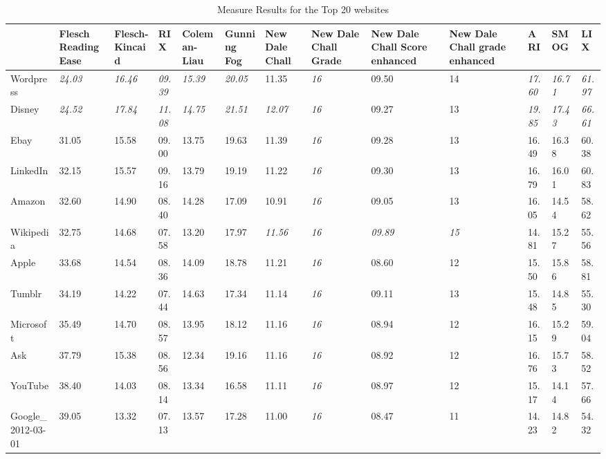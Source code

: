 \documentclass[runningheads,a4paper]{llncs}
\begin{document}
\begin{table}
  \centering
    \caption{Measure Results for the Top 20 websites}
    \begin{tabular}{p{3.3cm}p{1.5cm}p{1.5cm}p{1.5cm}p{1.5cm}p{1.5cm}p{1.5cm}p{1.5cm}p{1.5cm}p{1.5cm}p{1.5cm}p{1.5cm}p{1.5cm}}
    \toprule
    \textbf{} & \textbf{Flesch Reading Ease} & \textbf{Flesch-Kincaid} & \textbf{RIX} & \textbf{Coleman-Liau} & \textbf{Gunning Fog} & \textbf{New Dale Chall} & \textbf{New Dale Chall Grade} & \textbf{New Dale Chall Score enhanced} & \textbf{New Dale Chall grade enhanced} & \textbf{ARI} & \textbf{SMOG} & \textbf{LIX} \\
    \midrule
    Wordpress & \textit{24.03} & \textit{16.46} & \textit{09.39} & \textit{15.39} & \textit{20.05} & 11.35 & \textit{16} & 09.50 & 14    & \textit{17.60} & \textit{16.71} & \textit{61.97} \\
    Disney & \textit{24.52} & \textit{17.84} & \textit{11.08} & \textit{14.75} & \textit{21.51} & \textit{12.07} & \textit{16} & 09.27 & 13    & \textit{19.85} & \textit{17.43} & \textit{66.61} \\
    Ebay  & 31.05 & 15.58 & 09.00 & 13.75 & 19.63 & 11.39 & \textit{16} & 09.28 & 13    & 16.49 & 16.38 & 60.38 \\
    LinkedIn & 32.15 & 15.57 & 09.16 & 13.79 & 19.19 & 11.22 & \textit{16} & 09.30 & 13    & 16.79 & 16.01 & 60.83 \\
    Amazon & 32.60 & 14.90 & 08.40 & 14.28 & 17.09 & 10.91 & \textit{16} & 09.05 & 13    & 16.05 & 14.54 & 58.62 \\
    Wikipedia & 32.75 & 14.68 & 07.58 & 13.20 & 17.97 & \textit{11.56} & \textit{16} & \textit{09.89} & \textit{15} & 14.81 & 15.27 & 55.56 \\
    Apple & 33.68 & 14.54 & 08.36 & 14.09 & 18.78 & 11.21 & \textit{16} & 08.60 & 12    & 15.50 & 15.86 & 58.81 \\
    Tumblr & 34.19 & 14.22 & 07.44 & 14.63 & 17.34 & 11.14 & \textit{16} & 09.11 & 13    & 15.48 & 14.85 & 55.30 \\
    Microsoft & 35.49 & 14.70 & 08.57 & 13.95 & 18.12 & 11.16 & \textit{16} & 08.94 & 12    & 16.15 & 15.29 & 59.04 \\
    Ask   & 37.79 & 15.38 & 08.56 & 12.34 & 19.16 & 11.16 & \textit{16} & 08.92 & 12    & 16.76 & 15.73 & 58.52 \\
    YouTube & 38.40 & 14.03 & 08.14 & 13.34 & 16.58 & 11.11 & \textit{16} & 08.97 & 12    & 15.17 & 14.14 & 57.66 \\
    Google\_2012-03-01 & 39.05 & 13.32 & 07.13 & 13.57 & 17.28 & 11.00 & \textit{16} & 08.47 & 11    & 14.23 & 14.82 & 54.32 \\

\end{tabular}
\end{table}
\end{document}
